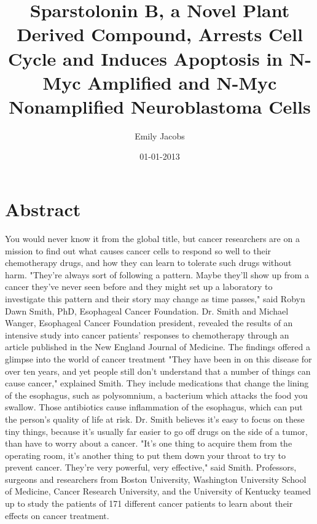 \documentclass{article}%
\title{Sparstolonin B, a Novel Plant Derived Compound, Arrests Cell Cycle and Induces Apoptosis in N{-}Myc Amplified and N{-}Myc Nonamplified Neuroblastoma Cells}%
\author{Emily Jacobs}%
\affil{Department of Biology and Biochemistry and the Centre for Regenerative Medicine, University of Bath, Bath, United Kingdom, \newline%
    Department of Pharmacy and Pharmacology and the Centre for Regenerative Medicine, University of Bath, Bath, United Kingdom}%
\date{01{-}01{-}2013}%
\begin{document}
%
\normalsize%
\maketitle%
\section{Abstract}%
\label{sec:Abstract}%
You would never know it from the global title, but cancer researchers are on a mission to find out what causes cancer cells to respond so well to their chemotherapy drugs, and how they can learn to tolerate such drugs without harm.\newline%
"They're always sort of following a pattern. Maybe they'll show up from a cancer they've never seen before and they might set up a laboratory to investigate this pattern and their story may change as time passes," said Robyn Dawn Smith, PhD, Esophageal Cancer Foundation.\newline%
Dr. Smith and Michael Wanger, Esophageal Cancer Foundation president, revealed the results of an intensive study into cancer patients' responses to chemotherapy through an article published in the New England Journal of Medicine.\newline%
The findings offered a glimpse into the world of cancer treatment\newline%
"They have been in on this disease for over ten years, and yet people still don't understand that a number of things can cause cancer," explained Smith.\newline%
They include medications that change the lining of the esophagus, such as polysomnium, a bacterium which attacks the food you swallow. Those antibiotics cause inflammation of the esophagus, which can put the person's quality of life at risk.\newline%
Dr. Smith believes it's easy to focus on these tiny things, because it's usually far easier to go off drugs on the side of a tumor, than have to worry about a cancer.\newline%
"It's one thing to acquire them from the operating room, it's another thing to put them down your throat to try to prevent cancer. They're very powerful, very effective," said Smith.\newline%
Professors, surgeons and researchers from Boston University, Washington University School of Medicine, Cancer Research University, and the University of Kentucky teamed up to study the patients of 171 different cancer patients to learn about their effects on cancer treatment.\newline%
\end{document}
